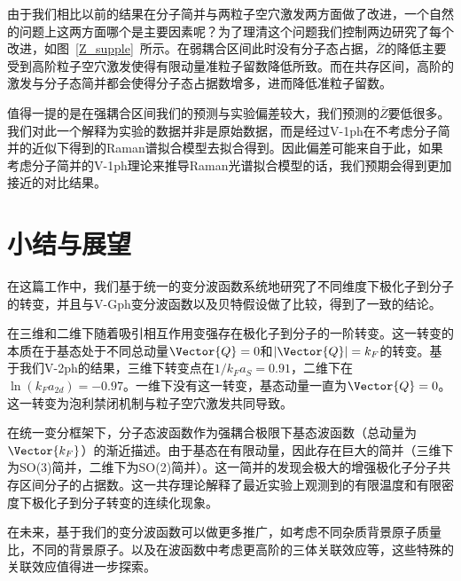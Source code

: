 由于我们相比以前的结果在分子简并与两粒子空穴激发两方面做了改进，一个自然的问题上这两方面哪个是主要因素呢？为了理清这个问题我们控制两边研究了每个改进，如图~\ref{Z_supple}~所示。在弱耦合区间此时没有分子态占据，$\bar{Z}$的降低主要受到高阶粒子空穴激发使得有限动量准粒子留数降低所致。而在共存区间，高阶的激发与分子态简并都会使得分子态占据数增多，进而降低准粒子留数。

值得一提的是在强耦合区间我们的预测与实验偏差较大，我们预测的$\bar{Z}$要低很多。我们对此一个解释为实验的数据并非是原始数据，而是经过V-1ph在不考虑分子简并的近似下得到的Raman谱拟合模型去拟合得到。因此偏差可能来自于此，如果考虑分子简并的V-1ph理论来推导Raman光谱拟合模型的话，我们预期会得到更加接近的对比结果。


\section{小结与展望}
在这篇工作中，我们基于统一的变分波函数系统地研究了不同维度下极化子到分子的转变，并且与V-Gph变分波函数以及贝特假设做了比较，得到了一致的结论。

在三维和二维下随着吸引相互作用变强存在极化子到分子的一阶转变。这一转变的本质在于基态处于不同总动量$\Vector{Q}=0$和$|\Vector{Q}|=k_F$的转变。基于我们V-2ph的结果，三维下转变点在$1/k_Fa_S=0.91$，二维下在$\ln(k_Fa_{2d})= -0.97$。一维下没有这一转变，基态动量一直为$\Vector{Q}=0$。这一转变为泡利禁闭机制与粒子空穴激发共同导致。

在统一变分框架下，分子态波函数作为强耦合极限下基态波函数（总动量为$\Vector{k_F}$）的渐近描述。由于基态在有限动量，因此存在巨大的简并（三维下为SO(3)简并，二维下为SO(2)简并）。这一简并的发现会极大的增强极化子分子共存区间分子的占据数。这一共存理论解释了最近实验上观测到的有限温度和有限密度下极化子到分子转变的连续化现象。

在未来，基于我们的变分波函数可以做更多推广，如考虑不同杂质背景原子质量比，不同的背景原子。以及在波函数中考虑更高阶的三体关联效应等，这些特殊的关联效应值得进一步探索。


